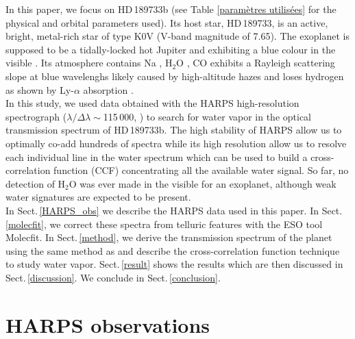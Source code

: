 \documentclass{aa}
\begin{document}
In this paper, we focus on HD\,189733b (see Table \ref{paramètres utilisées} for the physical and orbital parameters used). Its host star, HD\,189733, is an active, bright, metal-rich star of type K0{\sc V} (V-band magnitude of 7.65). The exoplanet is supposed to be a tidally-locked hot Jupiter and exhibiting a blue colour in the visible \citep{evans_deep_2013}. Its atmosphere contains Na \citep{redfield_sodium_2008,huitson_temperaturepressure_2012,wyttenbach_spectrally_2015,khalafinejad_exoplanetary_2016}, H$_{2}$O \citep{birkby_detection_2013,mccullough_water_2014,brogi_rotation_2016}, CO \citep{de_kok_detection_2013,brogi_rotation_2016} exhibits a Rayleigh scattering slope at blue wavelenghs \citep{pont_detection_2008,lecavelier_des_etangs_rayleigh_2008} likely caused by high-altitude hazes and loses hydrogen as shown by Ly-$\alpha$ absorption \citep{lecavelier_des_etangs_evaporation_2010,lecavelier_des_etangs_temporal_2012, bourrier_atmospheric_2013}.\\
In this study, we used data obtained with the HARPS high-resolution spectrograph ($\lambda/\Delta\lambda\sim$115\,000, \citealp{mayor_setting_2003}) to search for water vapor in the optical transmission spectrum of HD\,189733b. The high stability of HARPS allow us to optimally co-add hundreds of spectra while its high resolution allow us to resolve each individual line in the water spectrum which can be used to build a cross-correlation function (CCF) concentrating all the available water signal. So far, no detection of H$_{2}$O was ever made in the visible for an exoplanet, although weak water signatures are expected to be present. \\
In Sect.\,\ref{HARPS_obs} we describe the HARPS data used in this paper. In Sect.\,\ref{molecfit}, we correct these spectra from telluric features with the ESO tool Molecfit. In Sect.\,\ref{method}, we derive the transmission spectrum of the planet using the same method as \citet{wyttenbach_spectrally_2015,wyttenbach_hot_2017} and describe the cross-correlation function technique to study water vapor. Sect.\,\ref{result} shows the results which are then discussed in Sect.\,\ref{discussion}. We conclude in Sect.\,\ref{conclusion}.



\section{HARPS observations}
\end{document}
